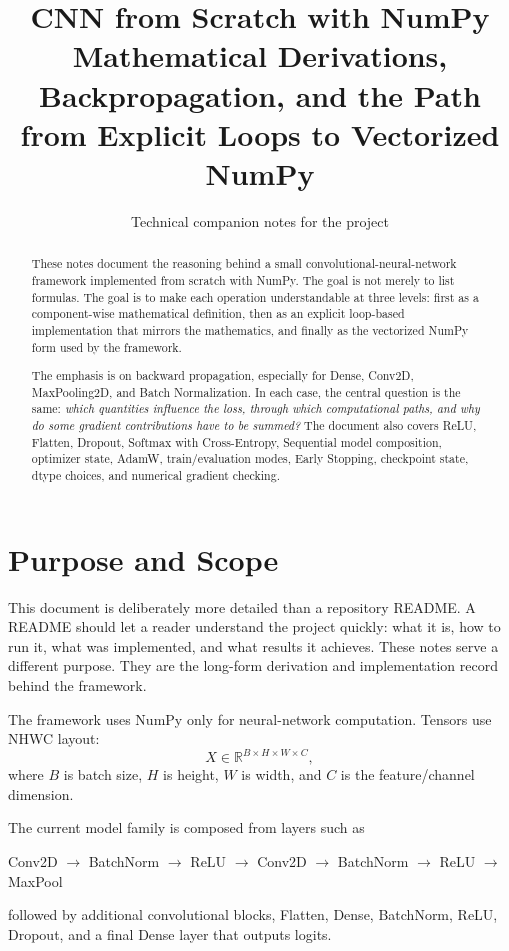 \documentclass[11pt,a4paper]{article}
\title{\textbf{CNN from Scratch with NumPy}\\[0.4em]
\large Mathematical Derivations, Backpropagation, and the Path from Explicit Loops to Vectorized NumPy}
\author{Technical companion notes for the project}
\date{}
\newcommand{\R}{\mathbb{R}}
\begin{document}
\maketitle
\thispagestyle{empty}

\begin{abstract}
These notes document the reasoning behind a small convolutional-neural-network framework implemented from scratch with NumPy. The goal is not merely to list formulas. The goal is to make each operation understandable at three levels: first as a component-wise mathematical definition, then as an explicit loop-based implementation that mirrors the mathematics, and finally as the vectorized NumPy form used by the framework.

The emphasis is on backward propagation, especially for Dense, Conv2D, MaxPooling2D, and Batch Normalization. In each case, the central question is the same: \emph{which quantities influence the loss, through which computational paths, and why do some gradient contributions have to be summed?} The document also covers ReLU, Flatten, Dropout, Softmax with Cross-Entropy, Sequential model composition, optimizer state, AdamW, train/evaluation modes, Early Stopping, checkpoint state, dtype choices, and numerical gradient checking.
\end{abstract}

\tableofcontents
\newpage

\section{Purpose and Scope}

This document is deliberately more detailed than a repository README. A README should let a reader understand the project quickly: what it is, how to run it, what was implemented, and what results it achieves. These notes serve a different purpose. They are the long-form derivation and implementation record behind the framework.

The framework uses NumPy only for neural-network computation. Tensors use NHWC layout:
\[
X \in \R^{B\times H\times W\times C},
\]
where $B$ is batch size, $H$ is height, $W$ is width, and $C$ is the feature/channel dimension.

The current model family is composed from layers such as
\begin{center}
Conv2D $\rightarrow$ BatchNorm $\rightarrow$ ReLU $\rightarrow$ Conv2D $\rightarrow$ BatchNorm $\rightarrow$ ReLU $\rightarrow$ MaxPool
\end{center}
followed by additional convolutional blocks, Flatten, Dense, BatchNorm, ReLU, Dropout, and a final Dense layer that outputs logits.
\end{document}
